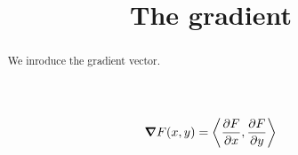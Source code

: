 \documentclass{ximera}
\title[Dig-In:]{The gradient}
\begin{document}
\begin{abstract}
We inroduce the gradient vector. 
\end{abstract}
\maketitle

\[
\grad F(x,y)= \vector{\pp[F]{x},\pp[F]{y}}
\]
\end{document}
